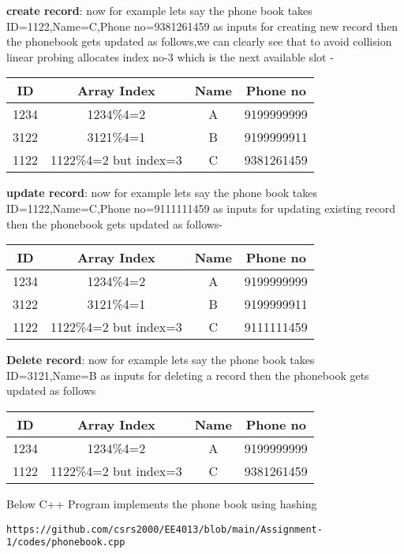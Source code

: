 \documentclass[journal,12pt,twocolumn]{IEEEtran}
\begin{document}
\textbf{create record}: now for example lets say the phone book takes ID=1122,Name=C,Phone no=9381261459 as inputs for creating new record then the phonebook gets updated as follows,we can clearly see that to avoid collision linear probing allocates index no-3 which is the next available slot  -
\begin{center}
\begin{tabular}{ |c|c|c|c| } 
 \hline
ID&Array Index&Name&Phone no\\
\hline 
1234&1234\%4=2&A&9199999999\\
3122&3121\%4=1&B&9199999911\\
1122&1122\%4=2 but index=3&C&9381261459\\
 \hline
\end{tabular}
\end{center}
\textbf{update  record}: now for example lets say the phone book takes ID=1122,Name=C,Phone no=9111111459 as inputs for updating existing record then the phonebook gets updated as follows-
\begin{center}
\begin{tabular}{ |c|c|c|c| } 
 \hline
ID&Array Index&Name&Phone no\\
\hline 
1234&1234\%4=2&A&9199999999\\
3122&3121\%4=1&B&9199999911\\
1122&1122\%4=2 but index=3&C&9111111459\\
 \hline
\end{tabular}
\end{center}
\textbf{Delete record}: now for example lets say the phone book takes ID=3121,Name=B as inputs for deleting a record then the phonebook gets updated as follows
\begin{center}
\begin{tabular}{ |c|c|c|c| } 
 \hline
ID&Array Index&Name&Phone no\\
\hline 
1234&1234\%4=2&A&9199999999\\
1122&1122\%4=2 but index=3&C&9381261459\\
 \hline
\end{tabular}
\end{center}
Below C++ Program implements the  phone book using hashing
\begin{lstlisting}
https://github.com/csrs2000/EE4013/blob/main/Assignment-1/codes/phonebook.cpp
\end{lstlisting}
\end{document}
